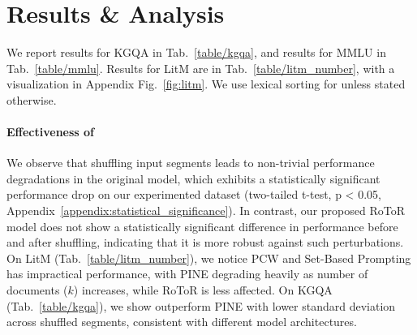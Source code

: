 \section{Results \& Analysis}

We report results for KGQA in Tab.~\ref{table/kgqa}, and results for MMLU in Tab.~\ref{table/mmlu}. 
Results for LitM are in Tab.~\ref{table/litm_number}, with a visualization in Appendix Fig.~\ref{fig:litm}.
We use lexical sorting for \ours{} unless stated otherwise.




\paragraph{Effectiveness of \ours{}}
We observe that shuffling input segments leads to non-trivial performance degradations in the original model, which exhibits a statistically significant performance drop on our experimented dataset (two-tailed t-test, p < 0.05, Appendix~\ref{appendix:statistical_significance}). In contrast, our proposed RoToR model does not show a statistically significant difference in performance before and after shuffling, indicating that it is more robust against such perturbations.
On LitM (Tab.~\ref{table/litm_number}), we notice PCW and Set-Based Prompting has impractical performance, with PINE degrading heavily as number of documents ($k$) increases, while RoToR is less affected. On KGQA (Tab.~\ref{table/kgqa}), we show \ours{} outperform PINE with lower standard deviation across shuffled segments, consistent with different model architectures. %

